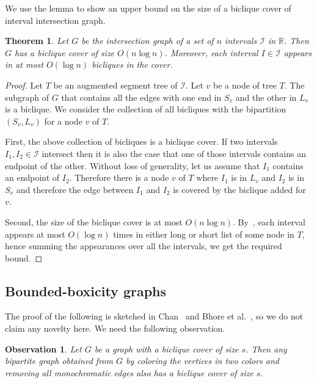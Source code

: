 \documentclass{amsart}
\newtheorem{theorem}{Theorem}%
\newtheorem{observation}{Observation}
\begin{document}
We use the lemma to show an upper bound on the size of a biclique cover of interval intersection graph.

\begin{theorem}\label{thm:intervals}
    Let $G$ be the intersection graph of a set of $n$ intervals $\mathcal{I}$ in $\mathbb{R}$. Then $G$ has a biclique cover of size $O(n \log n)$. 
    Moreover, each interval $I\in \mathcal{I}$ appears in at most $O(\log n)$ bicliques in the cover.
\end{theorem}

\begin{proof}
    Let $T$ be an augmented segment tree of $\mathcal{I}$. Let $v$ be a node of tree $T$. The subgraph of $G$ that contains all the edges with one end in $S_v$ and the other in $L_v$ is a biclique. We consider the collection of all bicliques with the bipartition $(S_v,L_v)$ for a node $v$ of $T$. 
    
    First, the above collection of bicliques is a biclique cover. If two intervals $I_1,I_2 \in \mathcal{I}$ intersect then it is also the case that one of those intervals contains an endpoint of the other. Without loss of generality, let us assume that $I_1$ contains an endpoint of $I_2$. Therefore there is a node $v$ of $T$ where $I_1$ is in $L_v$ and $I_2$ is in $S_v$ and therefore the edge between $I_1$ and $I_2   $ is covered by the biclique added for $v$. 
    
    Second, the size of the biclique cover is at most $O(n \log n)$. By~, each interval appears at most $O(\log n)$ times in either long or short list of some node in $T$, hence summing the appearances over all the intervals, we get the required bound. 
\end{proof}

\subsection{Bounded-boxicity graphs}

The proof of the following is sketched in Chan~\cite{cha06} and Bhore et al.~\cite{BCHST25}, so we do not claim any novelty here. 
We need the following observation.

\begin{observation}\label{obs:bip-subgraph}
    Let $G$ be a graph with a biclique cover of size $s$. Then any bipartite graph obtained from $G$ by coloring the vertices in two colors and removing all monochromatic edges also has a biclique cover of size $s$.
\end{observation}
\end{document}
